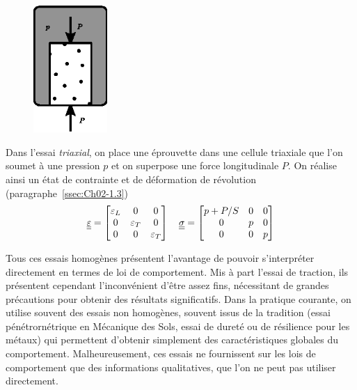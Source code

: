 \begin{figure}
    \begin{center}
        \includegraphics[width=2.8cm]{../images/T1_Ch04-0010}
    \end{center}
\end{figure}
Dans l'essai \emph{triaxial}, on place une éprouvette dans une cellule triaxiale que l'on soumet à une pression $p$ et on superpose une force longitudinale $P$.
On réalise ainsi un état de contrainte et de déformation de révolution (paragraphe~\ref{ssec:Ch02-1.3})
\begin{equation}
    \underline{\underline{\varepsilon}} =
    \begin{bmatrix}
        \varepsilon_L & 0 & 0 \\
        0 & \varepsilon_T & 0 \\
        0 & 0 & \varepsilon _T
    \end{bmatrix}
    \quad
    \underline{\underline{\sigma}} = 
    \begin{bmatrix}
        p + P/S & 0 & 0 \\
        0 & p & 0 \\
        0 & 0 & p
    \end{bmatrix}
    \label{eq:Ch04-038}
\end{equation}

Tous ces essais homogènes présentent l'avantage de pouvoir s'interpréter directement en termes de loi de comportement.
Mis à part l'essai de traction, ils présentent cependant l'inconvénient d'être assez fins, nécessitant de grandes précautions pour obtenir des résultats significatifs.
Dans la pratique courante, on utilise souvent des essais non homogènes, souvent issus de la tradition (essai pénétrornétrique en Mécanique des Sols, essai de dureté ou de résilience pour les métaux) qui permettent d'obtenir simplement des caractéristiques globales du comportement.
Malheureusement, ces essais ne fournissent sur les lois de comportement que des informations qualitatives, que l'on ne peut pas utiliser directement.

